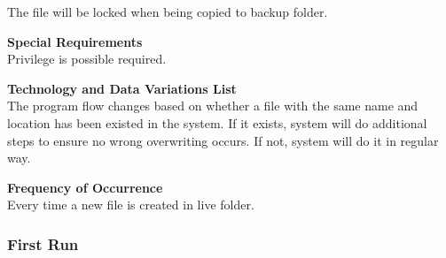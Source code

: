 \documentclass[12pt,a4paper]{article}
\begin{document}
\begin{description}
		The file will be locked when being copied to backup folder.
	\item \textbf{Special Requirements}\\
		Privilege is possible required.
	\item \textbf{Technology and Data Variations List}\\
		The program flow changes based on whether a file with the same name and location has been existed in the system. If it exists, system will do additional steps to ensure no wrong overwriting occurs. If not, system will do it in regular way.
	\item \textbf{Frequency of Occurrence}\\
		Every time a new file is created in live folder.
\end{description}

\subsubsection{First Run}
\end{document}
